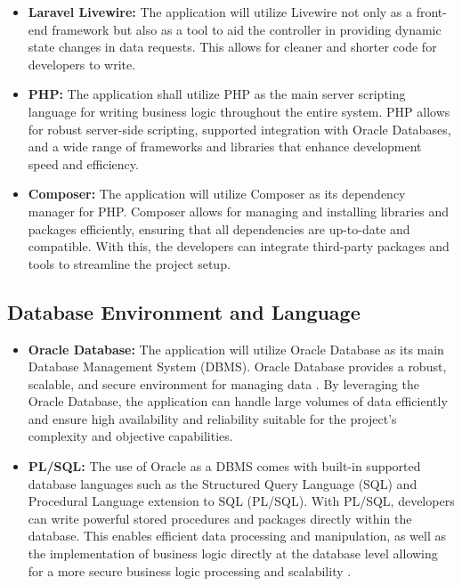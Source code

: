     \begin{itemize}
        \item[] \textbf{Laravel Livewire:} The application will utilize Livewire not only as a front-end framework but also as a tool to aid the controller in providing dynamic state changes in data requests. This allows for cleaner and shorter code for developers to write.
        \item[] \textbf{PHP:} The application shall utilize PHP as the main server scripting language for writing business logic throughout the entire system. PHP allows for robust server-side scripting, supported integration with Oracle Databases, and a wide range of frameworks and libraries that enhance development speed and efficiency. 
        \item[] \textbf{Composer:} The application will utilize Composer as its dependency manager for PHP. Composer allows for managing and installing libraries and packages efficiently, ensuring that all dependencies are up-to-date and compatible. With this, the developers can integrate third-party packages and tools to streamline the project setup.
      
    \end{itemize}

\subsection{Database Environment and Language}
    \begin{itemize}    
        \item[] \textbf{Oracle Database:} The application will utilize Oracle Database as its main Database Management System (DBMS). Oracle Database provides a robust, scalable, and secure environment for managing data \cite{oracle2nd}. By leveraging the Oracle Database, the application can handle large volumes of data efficiently and ensure high availability and reliability suitable for the project's complexity and objective capabilities.
        \item[] \textbf{PL/SQL:} The use of Oracle as a DBMS comes with built-in supported database languages such as the Structured Query Language (SQL) and Procedural Language extension to SQL (PL/SQL). With PL/SQL, developers can write powerful stored procedures and packages directly within the database. This enables efficient data processing and manipulation, as well as the implementation of business logic directly at the database level allowing for a more secure business logic processing and scalability \cite{oracle1nd}. 
    \end{itemize}